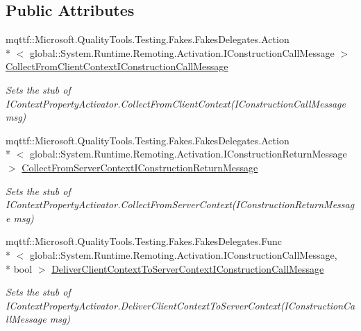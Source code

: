 \subsection*{Public Attributes}
\begin{DoxyCompactItemize}
\item 
mqttf\-::\-Microsoft.\-Quality\-Tools.\-Testing.\-Fakes.\-Fakes\-Delegates.\-Action\\*
$<$ global\-::\-System.\-Runtime.\-Remoting.\-Activation.\-I\-Construction\-Call\-Message $>$ \hyperlink{class_system_1_1_runtime_1_1_remoting_1_1_contexts_1_1_fakes_1_1_stub_i_context_property_activator_a2c76b625e10636889ef650b80f332e2f}{Collect\-From\-Client\-Context\-I\-Construction\-Call\-Message}
\begin{DoxyCompactList}\small\item\em Sets the stub of I\-Context\-Property\-Activator.\-Collect\-From\-Client\-Context(\-I\-Construction\-Call\-Message msg)\end{DoxyCompactList}\item 
mqttf\-::\-Microsoft.\-Quality\-Tools.\-Testing.\-Fakes.\-Fakes\-Delegates.\-Action\\*
$<$ global\-::\-System.\-Runtime.\-Remoting.\-Activation.\-I\-Construction\-Return\-Message $>$ \hyperlink{class_system_1_1_runtime_1_1_remoting_1_1_contexts_1_1_fakes_1_1_stub_i_context_property_activator_a217152914c3b48184299cfd1fa174d9f}{Collect\-From\-Server\-Context\-I\-Construction\-Return\-Message}
\begin{DoxyCompactList}\small\item\em Sets the stub of I\-Context\-Property\-Activator.\-Collect\-From\-Server\-Context(\-I\-Construction\-Return\-Message msg)\end{DoxyCompactList}\item 
mqttf\-::\-Microsoft.\-Quality\-Tools.\-Testing.\-Fakes.\-Fakes\-Delegates.\-Func\\*
$<$ global\-::\-System.\-Runtime.\-Remoting.\-Activation.\-I\-Construction\-Call\-Message, \\*
bool $>$ \hyperlink{class_system_1_1_runtime_1_1_remoting_1_1_contexts_1_1_fakes_1_1_stub_i_context_property_activator_a9433a0d78bd0a82a9551de9ecab9ed82}{Deliver\-Client\-Context\-To\-Server\-Context\-I\-Construction\-Call\-Message}
\begin{DoxyCompactList}\small\item\em Sets the stub of I\-Context\-Property\-Activator.\-Deliver\-Client\-Context\-To\-Server\-Context(\-I\-Construction\-Call\-Message msg)\end{DoxyCompactList}\item 

\end{DoxyCompactItemize}
